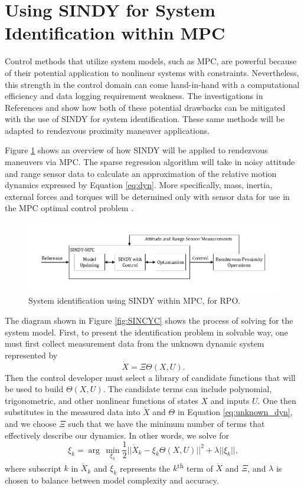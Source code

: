 \documentclass[letterpaper, preprint, paper,11pt]{AAS}	%
\begin{document}
\section{Using SINDY for System Identification within MPC}
Control methods that utilize system models, such as MPC, are powerful because of their potential application to nonlinear systems with constraints. Nevertheless, this strength in the control domain can come hand-in-hand with a computational efficiency and data logging requirement weakness. The investigations in References  and  show how both of these potential drawbacks can be mitigated with the use of SINDY for system identification. These same methods will be adapted to rendezvous proximity maneuver applications.

Figure \ref{fig:SINDY_MPC} shows an overview of how SINDY will be applied to rendezvous maneuvers via MPC. The sparse regression algorithm will take in noisy attitude and range sensor data to calculate an approximation of the relative motion dynamics expressed by Equation \eqref{eq:dyn}. More specifically, mass, inertia, external forces and torques will be determined only with sensor data for use in the MPC optimal control problem \cite{KaiserKutz_SINDyMPC}. 
\begin{figure}[h!]
	\centering\includegraphics[width=5.5in]{Figures/SINDY_MPC.pdf}
	\caption{System identification using SINDY within MPC, for RPO.}
	\label{fig:SINDY_MPC}
\end{figure}

The diagram shown in Figure \ref{fig:SINCYC} shows the process of solving for the system model. First, to present the identification problem in solvable way, one must first collect measurement data from the unknown dynamic system represented by
\begin{equation}
\label{eq:unknown_dyn}
\dot{X} = \Xi\Theta(X,U).
\end{equation}
Then the control developer must select a library of candidate functions that will be used to build $\Theta(X,U)$. The candidate terms can include polynomial, trigonometric, and other nonlinear functions of states $X$ and inputs $U$. One then substitutes in the measured data into $\dot{X}$ and $\Theta$ in Equation \eqref{eq:unknown_dyn}, and we choose $\Xi$ such that we have the minimum number of terms that effectively describe our dynamics. In other words, we solve for  
\begin{equation}
\label{eq:sparse_reg}
\xi_k = \arg\,\min\limits_{\xi_k}\frac{1}{2}||\dot{X}_k-\xi_k\Theta(X,U)||^2+\lambda||\xi_k||, 
\end{equation}
where subscript $k$ in $\dot{X}_k$ and $\xi_k$ represents the $k$\textsuperscript{th} term of $\dot{X}$ and $\Xi$, and $\lambda$ is chosen to balance between model complexity and accuracy.
\end{document}
